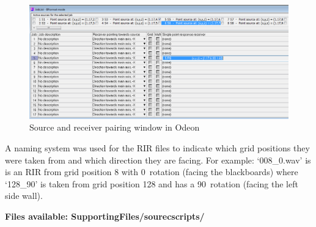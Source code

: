 \documentclass[../../main.tex]{subfiles}
\begin{document}
			\begin{figure}[H]
				\centerline{\includegraphics[scale = 0.4]{Sections/Implementation/Odeon/images/SouRecPos/SouRecSelection_crop.png}}
				\caption{Source and receiver pairing window in Odeon}
				\label{SouRecPos}
			\end{figure}

			A naming system was used for the \ac{RIR} files to indicate which grid positions they were taken from and which direction they are facing. For example: `008\_0.wav' is is an \ac{RIR} from grid position 8 with 0\textdegree~rotation (facing the blackboards) where `128\_90' is taken from grid position 128 and has a 90\textdegree~rotation (facing the left side wall).

			\textbf{Files available: SupportingFiles/sourecscripts/}

	
\end{document}
